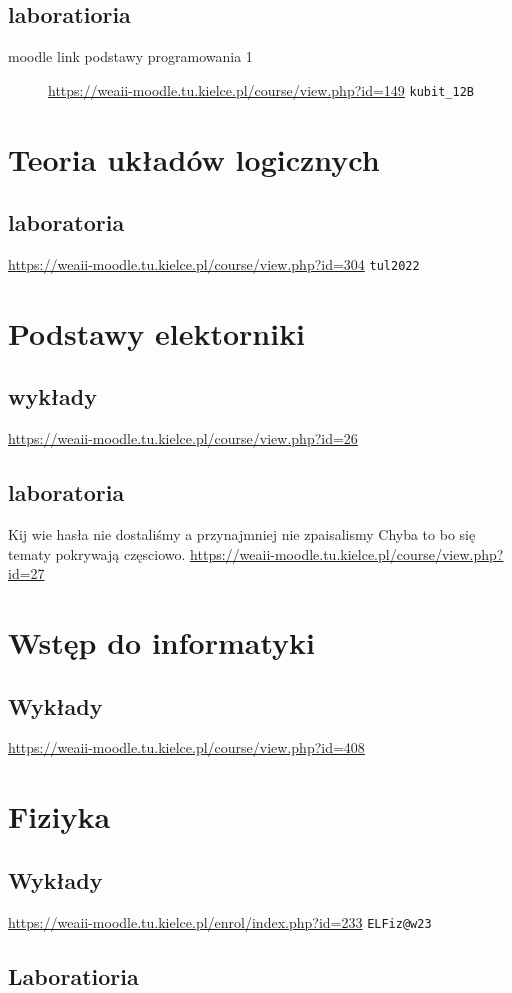 \documentclass[11pt]{article}
\begin{document}
\subsection{laboratioria}
\label{sec:org3f94b75}
\begin{description}
\item[{moodle link podstawy programowania 1}] \url{https://weaii-moodle.tu.kielce.pl/course/view.php?id=149} \texttt{kubit\_12B}
\end{description}
\section{Teoria układów logicznych}
\label{sec:org2013d55}
\subsection{laboratoria}
\label{sec:org7ce4b8e}
\url{https://weaii-moodle.tu.kielce.pl/course/view.php?id=304} \texttt{tul2022}
\section{Podstawy elektorniki}
\label{sec:orgc1cf8f9}
\subsection{wykłady}
\label{sec:orgc6b7ce9}
\url{https://weaii-moodle.tu.kielce.pl/course/view.php?id=26}
\subsection{laboratoria}
\label{sec:orgf5983e7}
Kij wie hasła nie dostaliśmy a przynajmniej nie zpaisalismy
Chyba to bo się tematy pokrywają częsciowo.
\url{https://weaii-moodle.tu.kielce.pl/course/view.php?id=27}
\section{Wstęp do informatyki}
\label{sec:org27cbd18}
\subsection{Wykłady}
\label{sec:org71e6a39}
\url{https://weaii-moodle.tu.kielce.pl/course/view.php?id=408}
\section{Fiziyka}
\label{sec:org6d37880}
\subsection{Wykłady}
\label{sec:org40ceeb0}
\url{https://weaii-moodle.tu.kielce.pl/enrol/index.php?id=233} \texttt{ELFiz@w23}
\subsection{Laboratioria}
\label{sec:org6371c81}
\end{document}
